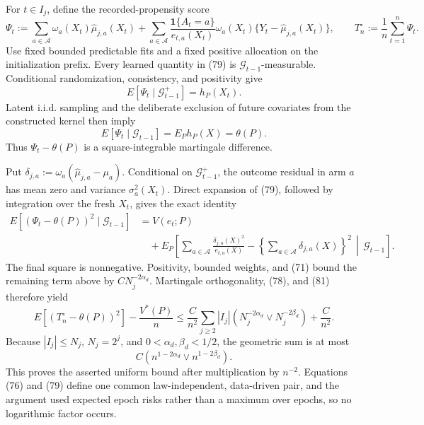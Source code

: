 For \(t\in I_j\), define the recorded-propensity score
\[
\Psi_t:=
\sum_{a\in\mathcal A}\omega_a(X_t)\widehat\mu_{j,a}(X_t)
+\sum_{a\in\mathcal A}
\frac{\mathbf1\{A_t=a\}}{e_{t,a}(X_t)}
\omega_a(X_t)\{Y_t-\widehat\mu_{j,a}(X_t)\},
\qquad
T_n^{\circ}:=\frac1n\sum_{t=1}^n\Psi_t.
\tag{79}
\]
Use fixed bounded predictable fits and a fixed positive allocation on the initialization prefix. Every learned quantity in (79) is \(\mathcal G_{t-1}\)-measurable. Conditional randomization, consistency, and positivity give
\[
E[\Psi_t\mid\mathcal G_{t-1}^{+}]=h_P(X_t).
\]
Latent i.i.d. sampling and the deliberate exclusion of future covariates from the constructed kernel then imply
\[
E[\Psi_t\mid\mathcal G_{t-1}]=E_Ph_P(X)=\theta(P).
\tag{80}
\]
Thus \(\Psi_t-\theta(P)\) is a square-integrable martingale difference.

Put \(\delta_{j,a}:=\omega_a(\widehat\mu_{j,a}-\mu_a)\). Conditional on \(\mathcal G_{t-1}^{+}\), the outcome residual in arm \(a\) has mean zero and variance \(\sigma_a^2(X_t)\). Direct expansion of (79), followed by integration over the fresh \(X_t\), gives the exact identity
\[
\begin{aligned}
E[(\Psi_t-\theta(P))^2\mid\mathcal G_{t-1}]
&=V(e_t;P)\\
&\quad+E_P\!\left[
\sum_{a\in\mathcal A}\frac{\delta_{j,a}(X)^2}{e_{t,a}(X)}
-\left\{\sum_{a\in\mathcal A}\delta_{j,a}(X)\right\}^2
\,\middle|\,\mathcal G_{t-1}\right].
\end{aligned}
\tag{81}
\]
The final square is nonnegative. Positivity, bounded weights, and (71) bound the remaining term above by \(CN_j^{-2\alpha_d}\). Martingale orthogonality, (78), and (81) therefore yield
\[
E[(T_n^{\circ}-\theta(P))^2]-\frac{V^*(P)}n
\leq\frac{C}{n^2}\sum_{j\geq2}|I_j|
\left(N_j^{-2\alpha_d}\vee N_j^{-2\beta_d}\right)
+\frac{C}{n^2}.
\]
Because \(|I_j|\leq N_j\), \(N_j=2^j\), and \(0<\alpha_d,\beta_d<1/2\), the geometric sum is at most
\[
C\left(n^{1-2\alpha_d}\vee n^{1-2\beta_d}\right).
\]
This proves the asserted uniform bound after multiplication by \(n^{-2}\). Equations (76) and (79) define one common law-independent, data-driven pair, and the argument used expected epoch risks rather than a maximum over epochs, so no logarithmic factor occurs.